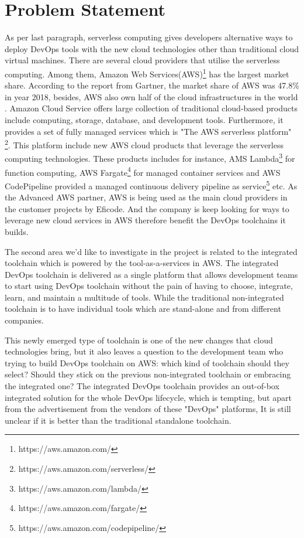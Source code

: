 \section{Problem Statement}
As per last paragraph, serverless computing gives developers alternative ways to deploy DevOps tools with the new cloud technologies other than traditional cloud virtual machines. There are several cloud providers that utilise the serverless computing.
Among them, Amazon Web Services(AWS)\footnote{https://aws.amazon.com/} has the largest market share. According to the report from Gartner, the market share of AWS was 47.8\% in year 2018, besides, AWS also own half of the cloud infrastructures in the world \cite{GartnerS47:online}.
Amazon Cloud Service offers large collection of traditional cloud-based products include computing, storage, database, and development tools. Furthermore, it provides a set of fully managed services which is "The AWS serverless platform" \footnote{https://aws.amazon.com/serverless/}. This platform include new AWS cloud products that leverage the serverless computing technologies. These products includes for instance, AMS Lambda\footnote{https://aws.amazon.com/lambda/} for function computing, AWS Fargate\footnote{https://aws.amazon.com/fargate/} for managed container services and AWS CodePipeline provided a managed continuous delivery pipeline as service\footnote{https://aws.amazon.com/codepipeline/} etc. As the Advanced AWS partner, AWS is being used as the main cloud providers in the customer projects by Eficode. And the company is keep looking for ways to leverage new cloud services in AWS therefore benefit the DevOps toolchains it builds.
\par
The second area we'd like to investigate in the project is related to the integrated toolchain which is powered by the tool-as-a-services in AWS.
The integrated DevOps toolchain is delivered as a single platform that allows development teams to start using DevOps toolchain without the pain of having to choose, integrate, learn, and maintain a multitude of tools. While the traditional non-integrated toolchain is to have individual tools which are stand-alone and from different companies.
\par
This newly emerged type of toolchain is one of the new changes that cloud technologies bring, but it also leaves a question to the development team who trying to build DevOps toolchain on AWS: which kind of toolchain should they select? Should they stick on the previous non-integrated toolchain or embracing the integrated one? The integrated DevOps toolchain provides an out-of-box integrated solution for the whole DevOps lifecycle, which is tempting, but apart from the advertisement from the vendors of these "DevOps" platforms, It is still unclear if it is better than the traditional standalone toolchain. 
